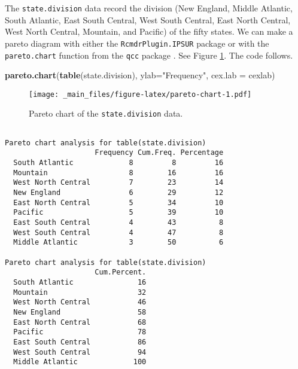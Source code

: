 \documentclass[]{book}
\newenvironment{Shaded}{\begin{snugshade}}{\end{snugshade}}
\newcommand{\KeywordTok}[1]{\textcolor[rgb]{0.13,0.29,0.53}{\textbf{{#1}}}}
\newcommand{\DataTypeTok}[1]{\textcolor[rgb]{0.13,0.29,0.53}{{#1}}}
\newcommand{\StringTok}[1]{\textcolor[rgb]{0.31,0.60,0.02}{{#1}}}
\newcommand{\NormalTok}[1]{{#1}}
\numberwithin{equation}{chapter}
\numberwithin{figure}{chapter}
\theoremstyle{plain}
\theoremstyle{definition}
\theoremstyle{remark}
\theoremstyle{definition}
\theoremstyle{definition}
\theoremstyle{remark}
\let\BeginKnitrBlock\begin \let\EndKnitrBlock\end
\begin{document}
\BeginKnitrBlock{example}[U.S. State Facts and Features]
\protect\hypertarget{ex:unnamed-chunk-49}{}{\label{ex:unnamed-chunk-49}
\iffalse (U.S. State Facts and Features) \fi }The
\texttt{state.division}  data record the division
(New England, Middle Atlantic, South Atlantic, East South Central, West
South Central, East North Central, West North Central, Mountain, and
Pacific) of the fifty states. We can make a pareto diagram with either
the \texttt{RcmdrPlugin.IPSUR}  package
\autocite{RcmdrPlugin.IPSUR} or with the \texttt{pareto.chart}
 function from the
\texttt{qcc}  package \autocite{qcc}. See Figure
\ref{fig:pareto-chart}. The code follows.
\EndKnitrBlock{example}

\begin{Shaded}
\begin{Highlighting}[]
\KeywordTok{pareto.chart}\NormalTok{(}\KeywordTok{table}\NormalTok{(state.division), }\DataTypeTok{ylab=}\StringTok{"Frequency"}\NormalTok{, }\DataTypeTok{cex.lab =} \NormalTok{cexlab)}
\end{Highlighting}
\end{Shaded}

\begin{figure}[htbp]
\centering
\texttt{[image: \_main\_files/figure-latex/pareto-chart-1.pdf]}
\caption{\label{fig:pareto-chart}\small Pareto chart of the \texttt{state.division}
data.}
\end{figure}

\begin{verbatim}
                    
Pareto chart analysis for table(state.division)
                     Frequency Cum.Freq. Percentage
  South Atlantic             8         8         16
  Mountain                   8        16         16
  West North Central         7        23         14
  New England                6        29         12
  East North Central         5        34         10
  Pacific                    5        39         10
  East South Central         4        43          8
  West South Central         4        47          8
  Middle Atlantic            3        50          6
                    
Pareto chart analysis for table(state.division)
                     Cum.Percent.
  South Atlantic               16
  Mountain                     32
  West North Central           46
  New England                  58
  East North Central           68
  Pacific                      78
  East South Central           86
  West South Central           94
  Middle Atlantic             100
\end{verbatim}
\end{document}
